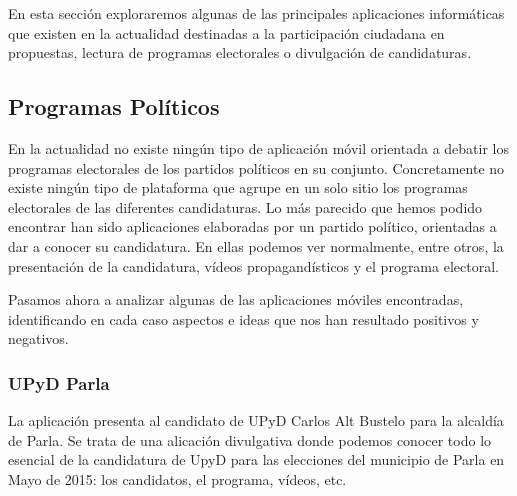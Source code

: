 En esta sección exploraremos algunas de las principales aplicaciones informáticas que existen en la actualidad destinadas a la participación ciudadana en propuestas, lectura de programas electorales o divulgación de candidaturas.

\subsection{Programas Políticos}

En la actualidad no existe ningún tipo de aplicación móvil orientada a debatir los programas electorales de los partidos políticos en su conjunto. Concretamente no existe ningún tipo de plataforma que agrupe en un solo sitio los programas electorales de las diferentes candidaturas.
Lo más parecido que hemos podido encontrar han sido aplicaciones elaboradas por un partido político, orientadas a dar a conocer su candidatura. En ellas podemos ver normalmente, entre otros, la presentación de la candidatura, vídeos propagandísticos y el programa electoral. 

Pasamos ahora a analizar algunas de las aplicaciones móviles encontradas, identificando en cada caso aspectos e ideas que nos han resultado positivos y negativos.

\subsubsection{UPyD Parla}
La aplicación presenta \cite{ref:UPyDParla} al candidato de UPyD Carlos Alt Bustelo para la alcaldía de Parla. Se trata de una alicación divulgativa donde podemos conocer todo lo esencial de la candidatura de UpyD para las elecciones del municipio de Parla en Mayo de 2015: los candidatos, el programa, vídeos, etc.


